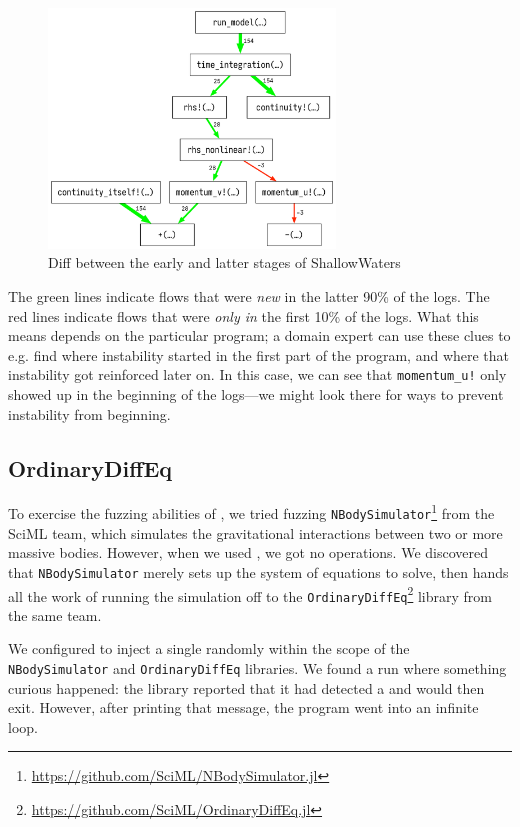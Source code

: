 \documentclass{juliacon}
\begin{document}
\begin{figure}[t]
  \centering
  \includegraphics[width=3in]{./fig/cstg_diff_pretty.png}
  \caption{Diff between the early and latter stages of ShallowWaters}
  \label{fig:cstg_diff_demo}
\end{figure}

The green lines indicate flows that were \emph{new} in the latter 90\% of the logs.
The red lines indicate flows that were \emph{only in} the first 10\% of the logs.
What this means depends on the particular program; a domain expert can use these clues to e.g. find where instability started in the first part of the program, and where that instability got reinforced later on.
In this case, we can see that \texttt{momentum\_u!} only showed up in the beginning of the logs---we might look there for ways to prevent instability from beginning.

\subsection{OrdinaryDiffEq}
\label{s:ode}

To exercise the fuzzing abilities of \FT{}, we tried fuzzing \texttt{NBodySimulator}\footnote{\url{https://github.com/SciML/NBodySimulator.jl}} from the SciML team, which simulates the gravitational interactions between two or more massive bodies.
However, when we used \FT{}, we got no \fp{} operations.
We discovered that \texttt{NBodySimulator} merely sets up the system of equations to solve, then hands all the work of running the simulation off to the \texttt{OrdinaryDiffEq}\footnote{\url{https://github.com/SciML/OrdinaryDiffEq.jl}} library from the same team.

We configured \FT{} to inject a single \NaN{} randomly within the scope of the \texttt{NBodySimulator} and \texttt{OrdinaryDiffEq} libraries.
We found a run where something curious happened: the library reported that it had detected a \NaN{} and would then exit.
However, after printing that message, the program went into an infinite loop.
\end{document}
